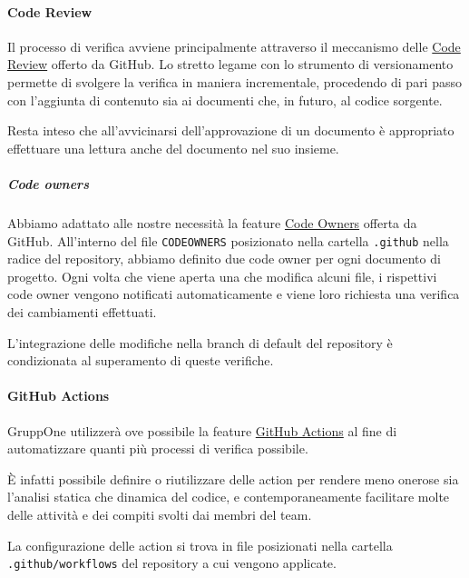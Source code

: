 \documentclass[../norme-di-progetto.tex]{subfiles}
\begin{document}
\paragraph{Code Review}%
\label{par:code_review}

Il processo di verifica avviene principalmente attraverso il meccanismo delle \href{https://github.com/features/code-review/}{Code Review} offerto da GitHub.
Lo stretto legame con lo strumento di versionamento permette di svolgere la verifica in maniera incrementale, procedendo di pari passo con l'aggiunta di contenuto sia ai documenti che, in futuro, al codice sorgente.

Resta inteso che all'avvicinarsi dell'approvazione di un documento è appropriato effettuare una lettura anche del documento nel suo insieme.


\subparagraph{Code owners}%
\label{subp:code_owners}

Abbiamo adattato alle nostre necessità la feature \href{https://help.github.com/en/github/creating-cloning-and-archiving-repositories/about-code-owners}{Code Owners} offerta da GitHub.
All'interno del file \verb|CODEOWNERS| posizionato nella cartella \verb|.github| nella radice del repository, abbiamo definito due code owner per ogni documento di progetto.
Ogni volta che viene aperta una  che modifica alcuni file, i rispettivi code owner vengono notificati automaticamente e viene loro richiesta una verifica dei cambiamenti effettuati.

L'integrazione delle modifiche nella branch di default del repository è condizionata al superamento di queste verifiche.

\paragraph{GitHub Actions}%
\label{par:github_actions}

GruppOne utilizzerà ove possibile la feature \href{https://help.github.com/en/actions/automating-your-workflow-with-github-actions/about-github-actions}{GitHub Actions} al fine di automatizzare quanti più processi di verifica possibile.

È infatti possibile definire o riutilizzare delle action per rendere meno onerose sia l'analisi statica che dinamica del codice, e contemporaneamente facilitare molte delle attività e dei compiti svolti dai membri del team.

La configurazione delle action si trova in file  posizionati nella cartella \verb|.github/workflows| del repository a cui vengono applicate.
\end{document}
